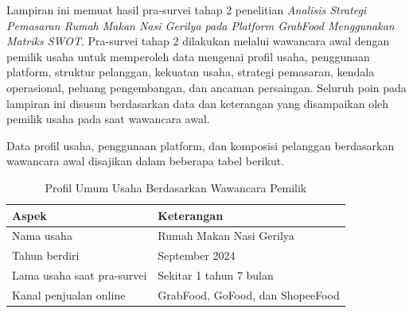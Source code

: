 \label{app:prasurvey2}

Lampiran ini memuat hasil pra-survei tahap 2 penelitian \textit{Analisis Strategi Pemasaran Rumah Makan Nasi Gerilya pada Platform GrabFood Menggunakan Matriks SWOT}. Pra-survei tahap 2 dilakukan melalui wawancara awal dengan pemilik usaha untuk memperoleh data mengenai profil usaha, penggunaan platform, struktur pelanggan, kekuatan usaha, strategi pemasaran, kendala operasional, peluang pengembangan, dan ancaman persaingan. Seluruh poin pada lampiran ini disusun berdasarkan data dan keterangan yang disampaikan oleh pemilik usaha pada saat wawancara awal.

Data profil usaha, penggunaan platform, dan komposisi pelanggan berdasarkan wawancara awal disajikan dalam beberapa tabel berikut.

\begin{table}[h!]
    \centering
    \caption{Profil Umum Usaha Berdasarkan Wawancara Pemilik}
    \label{tab:profil_prasurvey2}
    \begin{tabularx}{\textwidth}{lY}
        \toprule
        \textbf{Aspek}             & \textbf{Keterangan}              \\
        \midrule
        Nama usaha                 & Rumah Makan Nasi Gerilya         \\
        Tahun berdiri              & September 2024                   \\
        Lama usaha saat pra-survei & Sekitar 1 tahun 7 bulan          \\
        Kanal penjualan online     & GrabFood, GoFood, dan ShopeeFood \\
        \bottomrule
    \end{tabularx}
\end{table}

